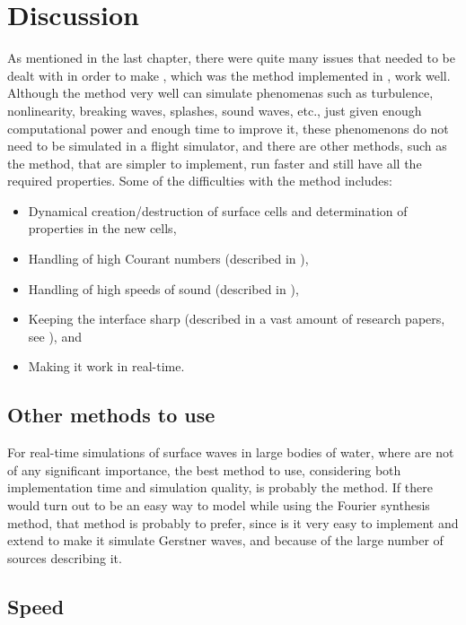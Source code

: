 \chapter{Discussion}

As mentioned in the last chapter, there were quite many issues that needed to be dealt with in order to make \thismethod, which was the method implemented in \thisprojectwork, work well. Although the method very well can simulate phenomenas such as turbulence, nonlinearity, breaking waves, splashes, sound waves, etc., just given enough computational power and enough time to improve it, these phenomenons do not need to be simulated in a flight simulator, and there are other methods, such as the \LPD method, that are simpler to implement, run faster and still have all the required properties. Some of the difficulties with the method includes:

\begin{itemize}
    \item Dynamical creation/destruction of surface cells and determination of properties in the new cells,
    \item Handling of high Courant numbers (described in \citep{Stam1999}),
    \item Handling of high speeds of sound (described in \citep{Kwatra2009}),
    \item Keeping the interface sharp (described in a vast amount of research papers, see ), and
    \item Making it work in real-time.
\end{itemize}

\section{Other methods to use}

For real-time simulations of surface waves in large bodies of water, where  are not of any significant importance, the best method to use, considering both implementation time and simulation quality, is probably the \LPD method. If there would turn out to be an easy way to model \FSI while using the Fourier synthesis method, that method is probably to prefer, since is it very easy to implement and extend to make it simulate Gerstner waves, and because of the large number of sources describing it.

\section{Speed}


